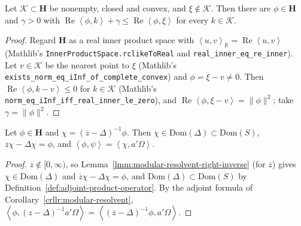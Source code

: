 \begin{lemma}
    \label{lmm:takesaki-separation}
    \leanok
    Let $\mathcal{K} \subset \mathbf{H}$ be nonempty, closed and convex, and $\xi \notin \mathcal{K}$. Then there are $\phi \in \mathbf{H}$ and $\gamma > 0$ with $\operatorname{Re}\left< \phi, k \right> + \gamma \le \operatorname{Re}\left< \phi, \xi \right>$ for every $k \in \mathcal{K}$.
\end{lemma}
\begin{proof}
    \leanok
    Regard $\mathbf{H}$ as a real inner product space with $\left< u, v \right>_{\mathbb{R}} = \operatorname{Re}\left< u, v \right>$ (Mathlib's \texttt{InnerProductSpace.rclikeToReal} and \texttt{real\_inner\_eq\_re\_inner}). Let $v \in \mathcal{K}$ be the nearest point to $\xi$ (Mathlib's \texttt{exists\_norm\_eq\_iInf\_of\_complete\_convex}) and $\phi = \xi - v \ne 0$. Then $\operatorname{Re}\left< \phi, k - v \right> \le 0$ for $k \in \mathcal{K}$ (Mathlib's \texttt{norm\_eq\_iInf\_iff\_real\_inner\_le\_zero}), and $\operatorname{Re}\left< \phi, \xi - v \right> = \|\phi\|^2$; take $\gamma = \|\phi\|^2$.
\end{proof}

\begin{lemma}
    \label{lmm:takesaki-transfer-resolvent}
    \leanok
    Let $\phi \in \mathbf{H}$ and $\chi = (\overline{z} - \Delta)^{-1}\phi$. Then $\chi \in \text{Dom}(\Delta) \subset \text{Dom}(S)$, $\overline{z}\chi - \Delta\chi = \phi$, and $\left< \phi, \psi \right> = \left< \chi, a'\Omega \right>$.
\end{lemma}
\begin{proof}
    \leanok
    $\overline{z} \notin [0, \infty)$, so Lemma~\ref{lmm:modular-resolvent-right-inverse} (for $\overline{z}$) gives $\chi \in \text{Dom}(\Delta)$ and $\overline{z}\chi - \Delta\chi = \phi$, and $\text{Dom}(\Delta) \subset \text{Dom}(S)$ by Definition~\ref{def:adjoint-product-operator}. By the adjoint formula of Corollary~\ref{crllr:modular-resolvent}, $\left< \phi, (z - \Delta)^{-1}a'\Omega \right> = \left< (\overline{z} - \Delta)^{-1}\phi, a'\Omega \right>$.
\end{proof}

